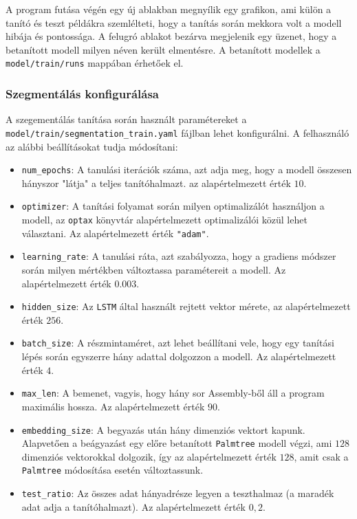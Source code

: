 A program futása végén egy új ablakban megnyílik egy grafikon, ami külön
a tanító és teszt példákra szemlélteti, hogy a tanítás során mekkora volt
a modell hibája és pontossága. A felugró ablakot bezárva megjelenik egy üzenet,
hogy a betanított modell milyen néven került elmentésre. A betanított
modellek a \texttt{model/train/runs} mappában érhetőek el. 

\subsubsection{Szegmentálás konfigurálása}

A szegementálás tanítása során használt paramétereket
a \texttt{model/train/segmentation\_train.yaml} fájlban lehet konfigurálni.
A felhasználó az alábbi beállításokat tudja módosítani:
\begin{itemize}
    \item \texttt{num\_epochs}: A tanulási iterációk száma, azt adja meg, hogy
        a modell összesen hányszor "látja" a teljes tanítóhalmazt. az
        alapértelmezett érték $10$.
    \item \texttt{optimizer}: A tanítási folyamat során milyen optimalizálót
        használjon a modell, az \texttt{optax}\cite{TODO} könyvtár
        alapértelmezett optimalizálói közül lehet választani. Az
        alapértelmezett érték \texttt{"adam"}\cite{TODO}.
    \item \texttt{learning\_rate}: A tanulási ráta, azt szabályozza, hogy
    a gradiens módszer során milyen mértékben változtassa paramétereit
    a modell. Az alapértelmezett érték $0.003$.
    \item \texttt{hidden\_size}: Az \texttt{LSTM} által használt rejtett vektor
        mérete, az alapértelmezett érték $256$.
    \item \texttt{batch\_size}: A részmintaméret, azt lehet beállítani vele, hogy
        egy tanítási lépés során egyszerre hány adattal dolgozzon a modell. Az
        alapértelmezett érték $4$.
    \item \texttt{max\_len}: A bemenet, vagyis, hogy hány sor Assembly-ből áll
        a program maximális hossza. Az alapértelmezett érték $90$.
    \item \texttt{embedding\_size}: A begyazás után hány dimenziós vektort
        kapunk. Alapvetően a beágyazást egy előre betanított \texttt{Palmtree}
        modell végzi, ami $128$ dimenziós vektorokkal dolgozik, így az
        alapértelmezett érték $128$, amit csak a \texttt{Palmtree} módosítása
        esetén változtassunk.
    \item \texttt{test\_ratio}: Az összes adat hányadrésze legyen a teszthalmaz
        (a maradék adat adja a tanítóhalmazt). Az alapértelmezett érték $0,2$.
\end{itemize}

